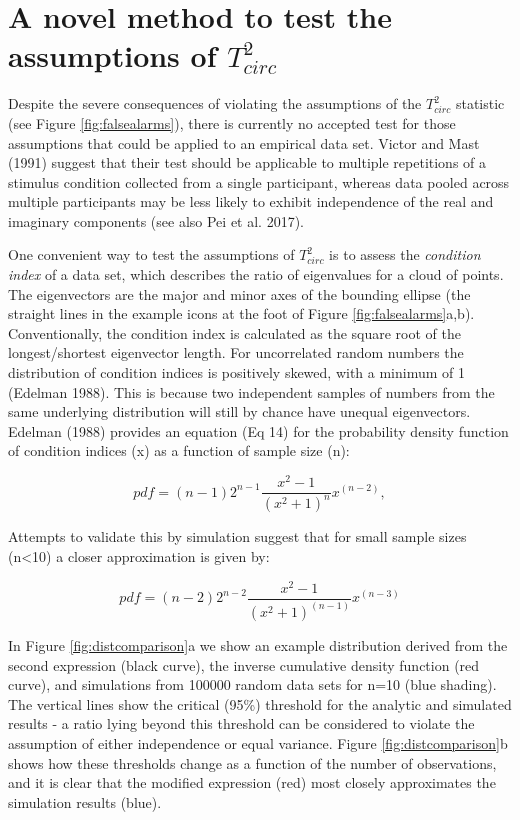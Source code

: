 \documentclass[]{article}
\begin{document}
\hypertarget{a-novel-method-to-test-the-assumptions-of-t2_circ}{%
\section{\texorpdfstring{A novel method to test the assumptions of \(T^2_{circ}\)}{A novel method to test the assumptions of T\^{}2\_\{circ\}}}\label{a-novel-method-to-test-the-assumptions-of-t2_circ}}

Despite the severe consequences of violating the assumptions of the \(T^2_{circ}\) statistic (see Figure \ref{fig:falsealarms}), there is currently no accepted test for those assumptions that could be applied to an empirical data set. Victor and Mast (1991) suggest that their test should be applicable to multiple repetitions of a stimulus condition collected from a single participant, whereas data pooled across multiple participants may be less likely to exhibit independence of the real and imaginary components (see also Pei et al. 2017).

One convenient way to test the assumptions of \(T^2_{circ}\) is to assess the \emph{condition index} of a data set, which describes the ratio of eigenvalues for a cloud of points. The eigenvectors are the major and minor axes of the bounding ellipse (the straight lines in the example icons at the foot of Figure \ref{fig:falsealarms}a,b). Conventionally, the condition index is calculated as the square root of the longest/shortest eigenvector length. For uncorrelated random numbers the distribution of condition indices is positively skewed, with a minimum of 1 (Edelman 1988). This is because two independent samples of numbers from the same underlying distribution will still by chance have unequal eigenvectors. Edelman (1988) provides an equation (Eq 14) for the probability density function of condition indices (x) as a function of sample size (n):

\begin{equation}
\label{eq:edelman1}
pdf = (n-1)2^{n-1}\frac{x^2 - 1}{(x^2 + 1)^n}x^{(n-2)},
\end{equation}

Attempts to validate this by simulation suggest that for small sample sizes (n\textless{}10) a closer approximation is given by:

\begin{equation}
\label{eq:edelman2}
pdf = (n-2)2^{n-2}\frac{x^2 - 1}{(x^2 + 1)^{(n-1)}}x^{(n-3)}
\end{equation}

In Figure \ref{fig:distcomparison}a we show an example distribution derived from the second expression (black curve), the inverse cumulative density function (red curve), and simulations from 100000 random data sets for n=10 (blue shading). The vertical lines show the critical (95\%) threshold for the analytic and simulated results - a ratio lying beyond this threshold can be considered to violate the assumption of either independence or equal variance. Figure \ref{fig:distcomparison}b shows how these thresholds change as a function of the number of observations, and it is clear that the modified expression (red) most closely approximates the simulation results (blue).
\end{document}
